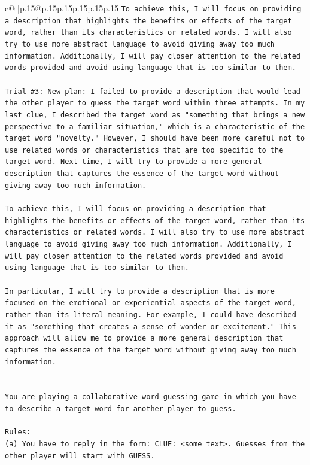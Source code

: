 \documentclass{article}
\begin{document}
{\begin{supertabular}{c@{$\;$}|p{.15\linewidth}@{}p{.15\linewidth}p{.15\linewidth}p{.15\linewidth}p{.15\linewidth}p{.15\linewidth}}
{{{\texttt{To achieve this, I will focus on providing a description that highlights the benefits or effects of the target word, rather than its characteristics or related words. I will also try to use more abstract language to avoid giving away too much information. Additionally, I will pay closer attention to the related words provided and avoid using language that is too similar to them.} \\
\\ 
\texttt{Trial \#3: New plan: I failed to provide a description that would lead the other player to guess the target word within three attempts. In my last clue, I described the target word as "something that brings a new perspective to a familiar situation," which is a characteristic of the target word "novelty." However, I should have been more careful not to use related words or characteristics that are too specific to the target word. Next time, I will try to provide a more general description that captures the essence of the target word without giving away too much information. } \\
\\ 
\texttt{To achieve this, I will focus on providing a description that highlights the benefits or effects of the target word, rather than its characteristics or related words. I will also try to use more abstract language to avoid giving away too much information. Additionally, I will pay closer attention to the related words provided and avoid using language that is too similar to them. } \\
\\ 
\texttt{In particular, I will try to provide a description that is more focused on the emotional or experiential aspects of the target word, rather than its literal meaning. For example, I could have described it as "something that creates a sense of wonder or excitement." This approach will allow me to provide a more general description that captures the essence of the target word without giving away too much information.} \\
\\ 
\\ 
\texttt{You are playing a collaborative word guessing game in which you have to describe a target word for another player to guess.} \\
\\ 
\texttt{Rules:} \\
\texttt{(a) You have to reply in the form: CLUE: <some text>. Guesses from the other player will start with GUESS.} \\
}}}
\end{supertabular}}
\end{document}

